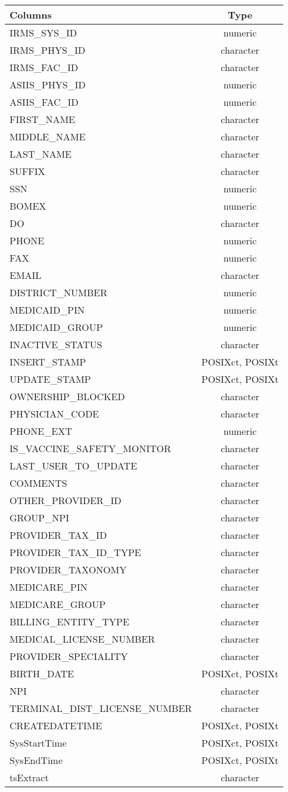 \documentclass[
  letterpaper,
  DIV=11,
  numbers=noendperiod]{scrreprt}
\begin{document}
\begin{longtable}{lc}
\toprule
Columns & Type \\ 
\midrule
IRMS\_SYS\_ID & numeric \\ 
IRMS\_PHYS\_ID & character \\ 
IRMS\_FAC\_ID & character \\ 
ASIIS\_PHYS\_ID & numeric \\ 
ASIIS\_FAC\_ID & numeric \\ 
FIRST\_NAME & character \\ 
MIDDLE\_NAME & character \\ 
LAST\_NAME & character \\ 
SUFFIX & character \\ 
SSN & numeric \\ 
BOMEX & numeric \\ 
DO & character \\ 
PHONE & numeric \\ 
FAX & numeric \\ 
EMAIL & character \\ 
DISTRICT\_NUMBER & numeric \\ 
MEDICAID\_PIN & numeric \\ 
MEDICAID\_GROUP & numeric \\ 
INACTIVE\_STATUS & character \\ 
INSERT\_STAMP & POSIXct, POSIXt \\ 
UPDATE\_STAMP & POSIXct, POSIXt \\ 
OWNERSHIP\_BLOCKED & character \\ 
PHYSICIAN\_CODE & character \\ 
PHONE\_EXT & numeric \\ 
IS\_VACCINE\_SAFETY\_MONITOR & character \\ 
LAST\_USER\_TO\_UPDATE & character \\ 
COMMENTS & character \\ 
OTHER\_PROVIDER\_ID & character \\ 
GROUP\_NPI & character \\ 
PROVIDER\_TAX\_ID & character \\ 
PROVIDER\_TAX\_ID\_TYPE & character \\ 
PROVIDER\_TAXONOMY & character \\ 
MEDICARE\_PIN & character \\ 
MEDICARE\_GROUP & character \\ 
BILLING\_ENTITY\_TYPE & character \\ 
MEDICAL\_LICENSE\_NUMBER & character \\ 
PROVIDER\_SPECIALITY & character \\ 
BIRTH\_DATE & POSIXct, POSIXt \\ 
NPI & character \\ 
TERMINAL\_DIST\_LICENSE\_NUMBER & character \\ 
CREATEDATETIME & POSIXct, POSIXt \\ 
SysStartTime & POSIXct, POSIXt \\ 
SysEndTime & POSIXct, POSIXt \\ 
tsExtract & character \\ 
\bottomrule
\end{longtable}
\end{document}
